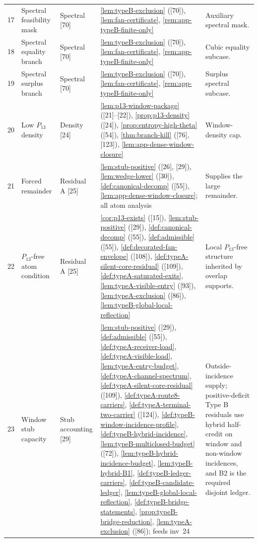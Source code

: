 \documentclass[11pt]{article}
\begin{document}
{\begin{longtable}{C{0.032\textwidth} L{0.145\textwidth} L{0.105\textwidth} L{0.50\textwidth} L{0.155\textwidth}}
17 & Spectral feasibility mask & Spectral {[70]} & \cref{lem:typeB-exclusion} ([70]), \cref{lem:fan-certificate}, \cref{rem:app-typeB-finite-only} & Auxiliary spectral mask. \\
18 & Spectral equality branch & Spectral {[70]} & \cref{lem:typeB-exclusion} ([70]), \cref{lem:fan-certificate}, \cref{rem:app-typeB-finite-only} & Cubic equality subcase. \\
19 & Spectral surplus branch & Spectral {[70]} & \cref{lem:typeB-exclusion} ([70]), \cref{lem:fan-certificate}, \cref{rem:app-typeB-finite-only} & Surplus spectral subcase. \\
20 & Low $P_{13}$ density & Density {[24]} & \cref{lem:p13-window-package} ([21]--[22]), \cref{prop:p13-density} ([24]), \cref{prop:entropy-high-theta} ([54]), \cref{thm:branch-kill} ([76], [123]), \cref{lem:app-dense-window-closure} & Window-density cap. \\
21 & Forced remainder & Residual A {[25]} & \cref{lem:stub-positive} ([26], [29]), \cref{lem:wedge-lower} ([30]), \cref{def:canonical-decomp} ([55]), \cref{lem:app-dense-window-closure}; all atom analysis & Supplies the large remainder. \\
22 & $P_{13}$-free atom condition & Residual A {[25]} & \cref{cor:p13-exists} ([15]), \cref{lem:stub-positive} ([29]), \cref{def:canonical-decomp} ([55]), \cref{def:admissible} ([55]), \cref{def:decorated-fan-envelope} ([108]), \cref{def:typeA-silent-core-residual} ([109]), \cref{def:typeA-saturated-exits}, \cref{lem:typeA-visible-entry} ([93]), \cref{lem:typeA-exclusion} ([86]), \cref{lem:typeB-global-local-reflection} & Local $P_{13}$-free structure inherited by overlap supports. \\
23 & Window stub capacity & Stub accounting {[29]} & \cref{lem:stub-positive} ([29]), \cref{def:admissible} ([55]), \cref{def:typeA-receiver-load}, \cref{def:typeA-visible-load}, \cref{lem:typeA-entry-budget}, \cref{def:typeA-channel-spectrum}, \cref{def:typeA-silent-core-residual} ([109]), \cref{def:typeA-route8-carriers}, \cref{def:typeA-terminal-two-carrier} ([124]), \cref{def:typeB-window-incidence-profile}, \cref{def:typeB-hybrid-incidence}, \cref{lem:typeB-multiclosed-budget} ([72]), \cref{lem:typeB-hybrid-incidence-budget}, \cref{lem:typeB-hybrid-B1}, \cref{def:typeB-ledger-carriers}, \cref{def:typeB-candidate-ledger}, \cref{lem:typeB-global-local-reflection}, \cref{def:typeB-bridge-statements}, \cref{prop:typeB-bridge-reduction}, \cref{lem:typeA-exclusion} ([86]); feeds inv~24 & Outside-incidence supply; positive-deficit Type B residuals use hybrid half-credit on window and non-window incidences, and B2 is the required disjoint ledger. \\

\end{longtable}}
\end{document}
